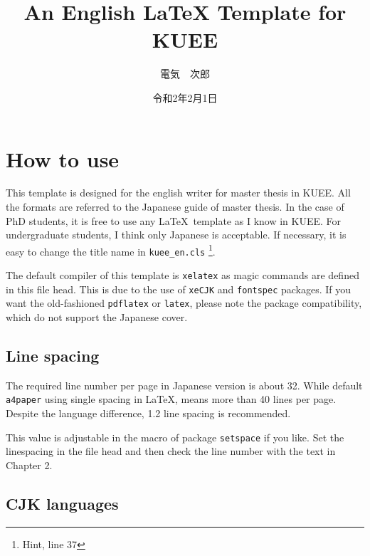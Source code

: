 \documentclass{kuee_en}
\title{An English \LaTeX{} Template for KUEE}
\author{{電気　次郎}} %
\date{{令和2年2月1日}}
\begin{document}
\maketitle

\begin{abstract}
    \lipsum[1]
\end{abstract}

\tableofcontents

\chapter{How to use}

This template is designed for the english writer for master thesis in KUEE. All the formats are referred to the Japanese guide of master thesis\cite{tebiki}.
In the case of PhD students, it is free to use any \LaTeX ~template as I know in KUEE. For undergraduate students, I think only Japanese is acceptable. If necessary, it is easy to change the title name in \verb|kuee_en.cls|
\footnote{Hint, line 37}.

The default compiler of this template is \verb|xelatex| as magic commands are defined in this file head. This is due to the use of \verb|xeCJK| and \verb|fontspec| packages. If you want the old-fashioned \verb|pdflatex| or \verb|latex|, please note the package compatibility, which do not support the Japanese cover.

\section{Line spacing}
The required line number per page in Japanese version\cite{tebiki} is about 32. While default \verb|a4paper| using single spacing in \LaTeX, means more than 40 lines per page. Despite the language difference, 1.2 line spacing is recommended.

This value is adjustable in the macro of package \verb|setspace| if you like. 
Set the linespacing in the file head and then check the line number with the text in Chapter 2.

\section{CJK languages}
\end{document}
